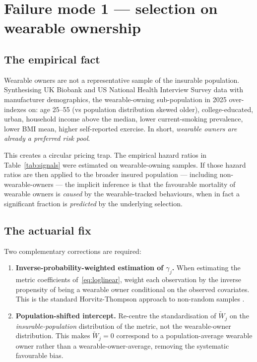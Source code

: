 \documentclass[11pt,a4paper]{article}
\let\origsection\section
\renewcommand{\section}{\clearpage\origsection}
\theoremstyle{ia}
\newcommand{\1}{\mathbf{1}}
\begin{document}
\section{Failure mode 1 --- selection on wearable ownership}\label{sec:selection}

\subsection{The empirical fact}\label{ss:sel-fact}

Wearable owners are not a representative sample of the insurable
population. Synthesising UK Biobank and US National Health Interview
Survey data with manufacturer demographics, the wearable-owning
sub-population in 2025 over-indexes on: age 25--55 (vs population
distribution skewed older), college-educated, urban, household income
above the median, lower current-smoking prevalence, lower BMI mean,
higher self-reported exercise. In short, \emph{wearable owners are
already a preferred risk pool}.

This creates a circular pricing trap. The empirical hazard ratios in
Table~\ref{tab:signals} were estimated on wearable-owning samples. If
those hazard ratios are then applied to the broader insured
population --- including non-wearable-owners --- the implicit
inference is that the favourable mortality of wearable owners is
\emph{caused} by the wearable-tracked behaviours, when in fact a
significant fraction is \emph{predicted} by the underlying selection.

\subsection{The actuarial fix}\label{ss:sel-fix}

Two complementary corrections are required:

\begin{enumerate}[leftmargin=*,nosep,topsep=4pt]
   \item \textbf{Inverse-probability-weighted estimation of $\gamma_j$.}
         When estimating the metric coefficients of~\eqref{eq:loglinear},
         weight each observation by the inverse propensity of being a
         wearable owner conditional on the observed covariates. This
         is the standard Horvitz-Thompson approach to non-random
         samples \citep{HorvitzThompson1952}.
   \item \textbf{Population-shifted intercept.} Re-centre the
         standardisation of $\tilde W_j$ on the
         \emph{insurable-population} distribution of the metric, not
         the wearable-owner distribution. This makes
         $\tilde W_j=0$ correspond to a population-average wearable
         owner rather than a wearable-owner-average, removing the
         systematic favourable bias.
\end{enumerate}
\end{document}
